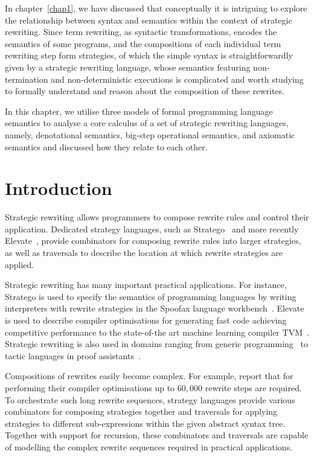 In chapter~\ref{chap1}, we have discussed that conceptually it is intriguing to explore the relationship between syntax and semantics within the context of strategic rewriting. Since term rewriting, as syntactic transformations, encodes the semantics of some programs, and the compositions of each individual term rewriting step form strategies, of which the simple syntax is straightforwardly given by a strategic rewriting language, whose semantics featuring non-termination and non-deterministic executions is complicated and worth studying to formally understand and reason about the composition of these rewrites.

In this chapter, we utilise three models of formal programming language semantics to analyse a core calculus of a set of strategic rewriting languages, namely, denotational semantics, big-step operational semantics, and axiomatic semantics and discussed how they relate to each other.

\section{Introduction}
\label{chap4:introduction}
Strategic rewriting allows programmers to compose rewrite rules and control their application.
Dedicated strategy languages, such as Stratego~\citep{DBLP:conf/icfp/VisserBT98,10.1007/3-540-45127-7_27} and more recently Elevate~\citep{DBLP:journals/cacm/HagedornLKQGS23,DBLP:journals/pacmpl/HagedornLKQGS20}, provide combinators for composing rewrite rules into larger strategies, as well as traversals to describe the location at which rewrite strategies are applied.

Strategic rewriting has many important practical applications. For instance, Stratego is used to specify the semantics of programming languages by writing interpreters with rewrite strategies in the Spoofax language workbench~\citep{DBLP:journals/software/WachsmuthKV14}.
Elevate is used to describe compiler optimisations for generating fast code achieving competitive performance to the state-of-the art machine learning compiler TVM~\citep{DBLP:journals/pacmpl/HagedornLKQGS20}. Strategic rewriting is also used in domains ranging from generic programming~\citep{DBLP:conf/rule/LammelV02} to tactic languages in proof assistants~\citep{sozeau2014proof}.

Compositions of rewrites easily become complex.
For example, \citet{DBLP:journals/pacmpl/HagedornLKQGS20} report that for performing their compiler optimisations up to $60,000$ rewrite steps are required. To orchestrate such long rewrite sequences, strategy languages provide various combinators for composing strategies together and traversals for applying strategies to different sub-expressions within the given abstract syntax tree.
Together with support for recursion, these combinators and traversals are capable of modelling the complex rewrite sequences required in practical applications.

